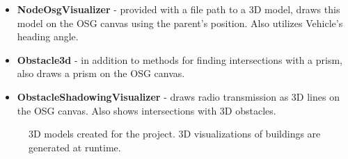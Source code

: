 \documentclass[]{nsm-thesis}
\begin{document}
\begin{itemize}

\item \textbf{NodeOsgVisualizer} - provided with a file path to a 3D model, draws this model on the \ac{OSG} canvas using the parent's position. Also utilizes Vehicle's heading angle. 

\item \textbf{Obstacle3d} - in addition to methods for finding intersections with a prism, also draws a prism on the \ac{OSG} canvas.

\item \textbf{ObstacleShadowingVisualizer} - draws radio transmission as 3D lines on the \ac{OSG} canvas. Also shows intersections with 3D obstacles. 

\end{itemize}

\begin{figure}%
    \centering
    \caption{3D models created for the project. 3D visualizations of buildings are generated at runtime.}%
    \label{fig:3dmodels}%
\end{figure}
\end{document}

